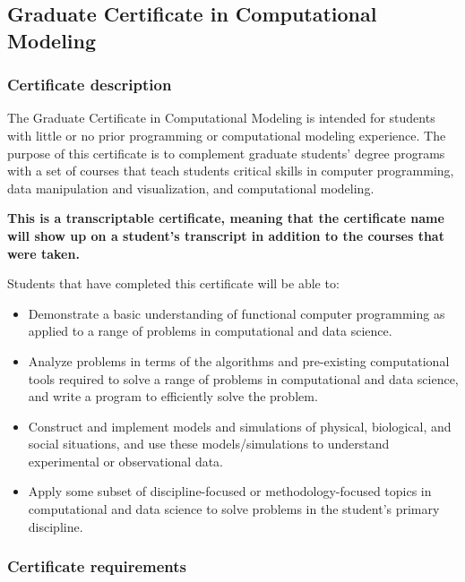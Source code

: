 \subsection{Graduate Certificate in Computational Modeling}
\label{sec:cert_model}

\subsubsection{Certificate description}

The Graduate Certificate in Computational Modeling is intended for
students with little or no prior programming or computational modeling
experience. The purpose of this certificate is to complement graduate
students' degree programs with a set of courses that teach students
critical skills in computer programming, data manipulation and
visualization, and computational modeling.  

\textbf{This is a transcriptable
certificate, meaning that the certificate name will show up on a
student's transcript in addition to the courses that were taken.}

\vspace{2mm}

\noindent
Students that have completed this certificate will be able to: 

\begin{itemize} 
\item  Demonstrate a basic understanding of functional computer
  programming as applied to a range of problems in computational and
  data science.  

\item  Analyze problems in terms of the algorithms and pre-existing
  computational tools required to solve a range of problems in
  computational and data science, and write a program to efficiently
  solve the problem.  

\item  Construct and implement models and simulations of physical,
  biological, and social situations, and use these models/simulations
  to understand experimental or observational data.  

\item  Apply some subset of discipline-focused or methodology-focused
topics in computational and data science to solve problems in the
student's primary discipline.

\end{itemize}

\subsubsection{Certificate requirements}

